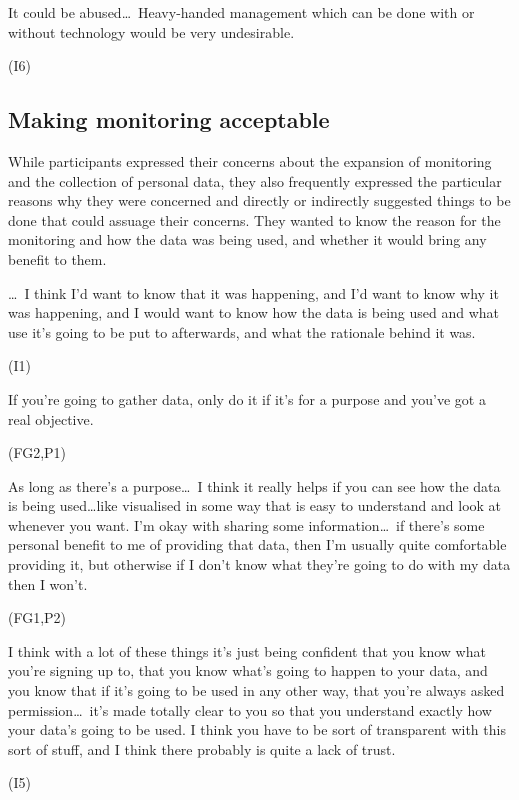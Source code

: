 \begin{qt}It could be abused\ldots\  Heavy-handed management which can
  be done with or without technology would be very
  undesirable.\end{qt} (I6) 

\subsection{Making monitoring acceptable}
\label{sec:making-monit-accept}

While participants expressed their concerns about the expansion of monitoring and the collection of personal data, they also frequently
expressed the particular reasons why they were concerned and directly
or indirectly suggested things to be done that could assuage their
concerns. They wanted to know the reason for the monitoring and how
the data was being used, and whether it would bring any benefit to them.

\begin{qt} \ldots\  I think I’d want to know
that it was happening, and I’d want to know why it was happening, and
I would want to know how the data is being used and what use it’s
going to be put to afterwards, and what the rationale behind it was.\end{qt} (I1)

\begin{qt}If you’re going to gather data, only do it if it’s for a purpose and you’ve got a real objective.\end{qt} (FG2,P1)

\begin{qt}As long as there’s a purpose\ldots\  I think it really helps if you can see how the data is being used…like visualised in some way that is easy to understand and look at whenever you want. I’m okay with sharing some information\ldots\  if there’s some personal benefit to me of providing that data, then I’m usually quite comfortable providing it, but otherwise if I don’t know what they’re going to do with my data then I won’t.\end{qt}(FG1,P2)

\begin{qt}I think with a lot of these things it’s just being confident that you
know what you’re signing up to, that you know what’s going to happen
to your data, and you know that if it’s going to be used in any other
way, that you’re always asked permission\ldots\  it’s made totally clear to
you so that you understand exactly how your data’s going to be used. I
think you have to be sort of transparent with this sort of stuff, and
I think there probably is quite a lack of trust.\end{qt} (I5)

